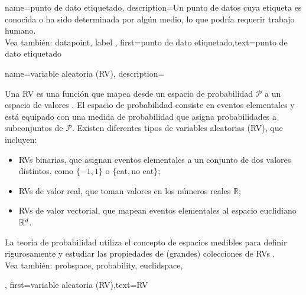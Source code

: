 {name={punto de dato etiquetado},
 description={Un punto de datos cuya etiqueta es conocida o ha sido determinada  
 por algún medio, lo que podría requerir trabajo humano.
 \\
	Vea también: \gls{datapoint},  \gls{label} },
 first={punto de dato etiquetado},text={punto de dato etiquetado}  
}

{name={variable aleatoria (RV)},
 description={Una RV es una función que mapea desde  
 	un espacio de probabilidad $\mathcal{P}$ a un espacio de valores \cite{BillingsleyProbMeasure,GrayProbBook}. 
 	El espacio de probabilidad consiste en eventos elementales y está equipado con una medida de probabilidad
 	que asigna probabilidades a subconjuntos de $\mathcal{P}$. 
 	Existen diferentes tipos de variables aleatorias (RV), que incluyen:  
 	\begin{itemize} 
 	\item {RVs binarias}, que asignan eventos elementales a un conjunto de dos valores distintos, como 
 	$\{-1,1\}$ o $\{\text{cat}, \text{no cat}\}$; 
 	\item {RVs de valor real}, que toman valores en los números reales $\mathbb{R}$;  
 	\item {RVs de valor vectorial}, que mapean eventos elementales al espacio euclidiano $\mathbb{R}^{d}$.  
 	\end{itemize} 
 	La teoría de probabilidad utiliza el concepto de espacios medibles para definir rigurosamente
 	y estudiar las propiedades de (grandes) colecciones de RVs \cite{BillingsleyProbMeasure}.
	 \\
	 Vea también: \gls{probspace}, \gls{probability}, \gls{euclidspace},  }, first={variable aleatoria (RV)},text={RV}  }
 
